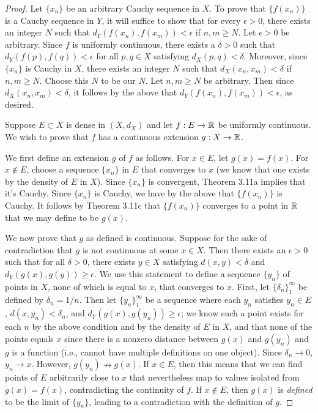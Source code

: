 \documentclass[../psets.tex]{subfiles}
\begin{document}
\begin{enumerate}[label={\textbf{\arabic*.}}]
    \begin{proof}
        Let $\{x_n\}$ be an arbitrary Cauchy sequence in $X$. To prove that $\{f(x_n)\}$ is a Cauchy sequence in $Y$, it will suffice to show that for every $\epsilon>0$, there exists an integer $N$ such that $d_Y(f(x_n),f(x_m))<\epsilon$ if $n,m\geq N$. Let $\epsilon>0$ be arbitrary. Since $f$ is uniformly continuous, there exists a $\delta>0$ such that $d_Y(f(p),f(q))<\epsilon$ for all $p,q\in X$ satisfying $d_X(p,q)<\delta$. Moreover, since $\{x_n\}$ is Cauchy in $X$, there exists an integer $N$ such that $d_X(x_n,x_m)<\delta$ if $n,m\geq N$. Choose this $N$ to be our $N$. Let $n,m\geq N$ be arbitrary. Then since $d_X(x_n,x_m)<\delta$, it follows by the above that $d_Y(f(x_n),f(x_m))<\epsilon$, as desired.\par\medskip
        Suppose $E\subset X$ is dense in $(X,d_X)$ and let $f:E\to\mathbb{R}$ be uniformly continuous. We wish to prove that $f$ has a continuous extension $g:X\to\mathbb{R}$.\par
        We first define an extension $g$ of $f$ as follows. For $x\in E$, let $g(x)=f(x)$. For $x\notin E$, choose a sequence $\{x_n\}$ in $E$ that converges to $x$ (we know that one exists by the density of $E$ in $X$). Since $\{x_n\}$ is convergent, Theorem 3.11a implies that it's Cauchy. Since $\{x_n\}$ is Cauchy, we have by the above that $\{f(x_n)\}$ is Cauchy. It follows by Theorem 3.11c that $\{f(x_n)\}$ converges to a point in $\mathbb{R}$ that we may define to be $g(x)$.\par
        We now prove that $g$ as defined is continuous. Suppose for the sake of contradiction that $g$ is not continuous at some $x\in X$. Then there exists an $\epsilon>0$ such that for all $\delta>0$, there exists $y\in X$ satisfying $d(x,y)<\delta$ and $d_Y(g(x),g(y))\geq\epsilon$. We use this statement to define a sequence $\{y_n\}$ of points in $X$, none of which is equal to $x$, that converges to $x$. First, let $\{\delta_n\}_1^\infty$ be defined by $\delta_n=1/n$. Then let $\{y_n\}_1^\infty$ be a sequence where each $y_n$ satisfies $y_n\in E$, $d(x,y_n)<\delta_n$, and $d_Y(g(x),g(y_n))\geq\epsilon$; we know such a point exists for each $n$ by the above condition and by the density of $E$ in $X$, and that none of the points equals $x$ since there is a nonzero distance between $g(x)$ and $g(y_n)$ and $g$ is a function (i.e., cannot have multiple definitions on one object). Since $\delta_n\to 0$, $y_n\to x$. However, $g(y_n)\nrightarrow g(x)$. If $x\in E$, then this means that we can find points of $E$ arbitrarily close to $x$ that nevertheless map to values isolated from $g(x)=f(x)$, contradicting the continuity of $f$. If $x\notin E$, then $g(x)$ is \emph{defined} to be the limit of $\{y_n\}$, leading to a contradiction with the definition of $g$.

\end{proof}
\end{enumerate}
\end{document}
